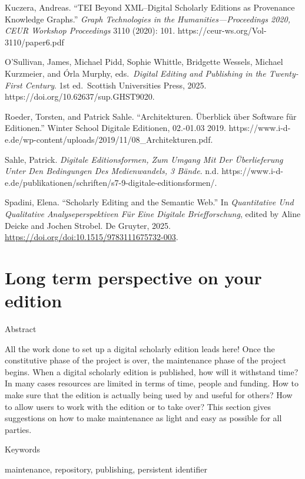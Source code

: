 \documentclass[
  letterpaper,
  DIV=11,
  numbers=noendperiod]{scrreprt}
\begin{document}
Kuczera, Andreas. ``TEI Beyond XML--Digital Scholarly Editions as
Provenance Knowledge Graphs.'' \emph{Graph Technologies in the
Humanities---Proceedings 2020, CEUR Workshop Proceedings} 3110 (2020):
101. https://ceur-ws.org/Vol-3110/paper6.pdf

O'Sullivan, James, Michael Pidd, Sophie Whittle, Bridgette Wessels,
Michael Kurzmeier, and Órla Murphy, eds.~\emph{Digital Editing and
Publishing in the Twenty-First Century}. 1st ed.~Scottish Universities
Press, 2025. https://doi.org/10.62637/sup.GHST9020.

Roeder, Torsten, and Patrick Sahle. ``Architekturen. Überblick über
Software für Editionen.'' Winter School Digitale Editionen, 02.-01.03
2019.
https://www.i-d-e.de/wp-content/uploads/2019/11/08\_Architekturen.pdf.

Sahle, Patrick. \emph{Digitale Editionsformen, Zum Umgang Mit Der
Überlieferung Unter Den Bedingungen Des Medienwandels, 3 Bände}. n.d.
https://www.i-d-e.de/publikationen/schriften/s7-9-digitale-editionsformen/.

Spadini, Elena. ``Scholarly Editing and the Semantic Web.'' In
\emph{Quantitative Und Qualitative Analyseperspektiven Für Eine Digitale
Briefforschung}, edited by Aline Deicke and Jochen Strobel. De Gruyter,
2025. \url{https://doi.org/doi:10.1515/9783111675732-003}.


\chapter{Long term perspective on your
edition}\label{long-term-perspective-on-your-edition}

Abstract

All the work done to set up a digital scholarly edition leads here! Once
the constitutive phase of the project is over, the maintenance phase of
the project begins. When a digital scholarly edition is published, how
will it withstand time? In many cases resources are limited in terms of
time, people and funding. How to make sure that the edition is actually
being used by and useful for others? How to allow users to work with the
edition or to take over? This section gives suggestions on how to make
maintenance as light and easy as possible for all parties.

Keywords

maintenance, repository, publishing, persistent identifier
\end{document}
